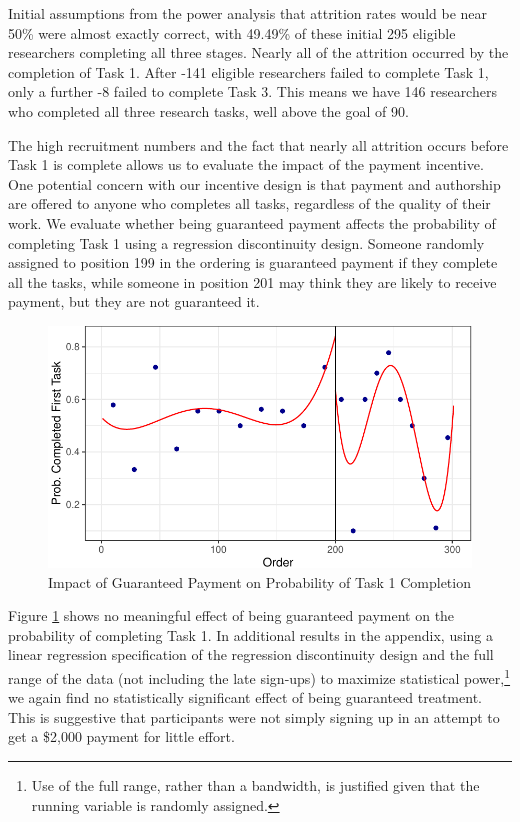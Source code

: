 \documentclass[
  letterpaper,
  DIV=11,
  numbers=noendperiod]{scrartcl}
\begin{document}
Initial assumptions from the power analysis that attrition rates would
be near 50\% were almost exactly correct, with 49.49\% of these initial
295 eligible researchers completing all three stages. Nearly all of the
attrition occurred by the completion of Task 1. After -141 eligible
researchers failed to complete Task 1, only a further -8 failed to
complete Task 3. This means we have 146 researchers who completed all
three research tasks, well above the goal of 90.

The high recruitment numbers and the fact that nearly all attrition
occurs before Task 1 is complete allows us to evaluate the impact of the
payment incentive. One potential concern with our incentive design is
that payment and authorship are offered to anyone who completes all
tasks, regardless of the quality of their work. We evaluate whether
being guaranteed payment affects the probability of completing Task 1
using a regression discontinuity design. Someone randomly assigned to
position 199 in the ordering is guaranteed payment if they complete all
the tasks, while someone in position 201 may think they are likely to
receive payment, but they are not guaranteed it.

\begin{figure}

{\centering \includegraphics{The-Sources-of-Researcher-Variation-in-Economics_files/figure-pdf/fig-rdd-1.pdf}

}

\caption{\label{fig-rdd}Impact of Guaranteed Payment on Probability of
Task 1 Completion}

\end{figure}

Figure \ref{fig-rdd} shows no meaningful effect of being guaranteed
payment on the probability of completing Task 1. In additional results
in the appendix, using a linear regression specification of the
regression discontinuity design and the full range of the data (not
including the late sign-ups) to maximize statistical power,\footnote{Use
  of the full range, rather than a bandwidth, is justified given that
  the running variable is randomly assigned.} we again find no
statistically significant effect of being guaranteed treatment. This is
suggestive that participants were not simply signing up in an attempt to
get a \$2,000 payment for little effort.
\end{document}
